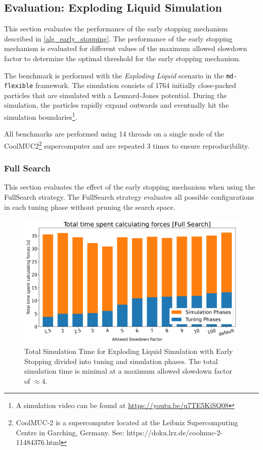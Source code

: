 \documentclass[conference]{IEEEtran}
\begin{document}
\subsection{Evaluation: Exploding Liquid Simulation}
\label{sec:evaluation}

This section evaluates the performance of the early stopping mechanism described in \autoref{alg_early_stopping}. The performance of the early stopping mechanism is evaluated for different values of the maximum allowed slowdown factor to determine the optimal threshold for the early stopping mechanism.

The benchmark is performed with the \textit{Exploding Liquid} scenario in the \texttt{md-flexible} framework. The simulation consists of 1764 initially close-packed particles that are simulated with a Lennard-Jones potential. During the simulation, the particles rapidly expand outwards and eventually hit the simulation boundaries\footnote{A simulation video can be found at \url{https://youtu.be/u7TE5KiSQ08}}.

All benchmarks are performed using 14 threads on a single node of the CoolMUC2\footnote{CoolMUC-2 is a supercomputer located at the Leibniz Supercomputing Centre in Garching, Germany. See: https://doku.lrz.de/coolmuc-2-11484376.html} supercomputer and are repeated 3 times to ensure reproducibility.

\subsubsection{Full Search}

This section evaluates the effect of the early stopping mechanism when using the FullSearch strategy. The FullSearch strategy evaluates all possible configurations in each tuning phase without pruning the search space.

\begin{figure}[H]
    \centering

    \includegraphics[width=\columnwidth]{../data/explodingLiquid/cluster/fullSearch/analytics/total_time_average.png}

    \caption{Total Simulation Time for Exploding Liquid Simulation with Early Stopping divided into tuning and simulation phases. The total simulation time is minimal at a maximum allowed slowdown factor of $\approx4$.}
\end{figure}
\end{document}
